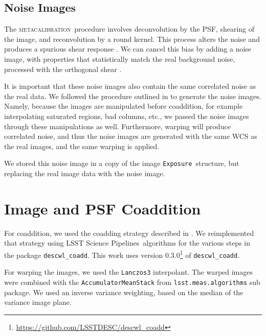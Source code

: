\documentclass[twocolumn,twocolappendix,astrosym]{openjournal}
\newcommand{\calexp}{\texttt{Exposure}}
\newcommand{\dm}{LSST Science Pipelines}
\newcommand{\mcal}{\textsc{metacalibration}}
\begin{document}
\subsection{Noise Images} \label{sec:sim:noiseimages}

The \mcal\ procedure involves deconvolution by the PSF, shearing of the image,
and reconvolution by a round kernel.  This process alters the noise and
produces a spurious shear response \citep{SheldonMcal2017}.  We can cancel this
bias by adding a noise image, with properties that statistically match the real
background noise, processed with the orthogonal shear
\citep{SheldonMcal2017,mdet20}.

It is important that these noise images also contain the same correlated noise
as the real data. We followed the procedure outlined in \citet{BeckerMdetCoadd}
to generate the noise images. Namely, because the images are manipulated before
coaddition, for example interpolating saturated regions, bad columns, etc., we
passed the noise images through these manipulations as well. Furthermore,
warping will produce correlated noise, and thus the noise images are generated
with the same WCS as the real images, and the same warping is applied.

We stored this noise image in a copy of the image \calexp\ structure, but
replacing the real image data with the noise image.

\section{Image and PSF Coaddition} \label{sec:coadding}

For coaddition, we used the coadding strategy described in
\citet{BeckerMdetCoadd}. We reimplemented that strategy using \dm\ algorithms
for the various steps in the package \texttt{descwl\_coadd}. This work uses
version 0.3.0\footnote{\url{https://github.com/LSSTDESC/descwl_coadd}} of
\texttt{descwl\_coadd}.

For warping the images, we used the \texttt{Lanczos3} interpolant. The warped
images were combined with the \texttt{AccumulatorMeanStack} from
\texttt{lsst.meas.algorithms} sub package. We used an inverse variance
weighting, based on the median of the variance image plane.
\end{document}
